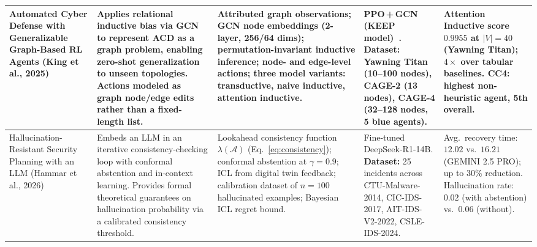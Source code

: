 \documentclass[letterpaper, 10 pt, conference]{ieeeconf}
\begin{document}
\begin{table}[!t]
{\begin{tabular}{|p{3.0cm}|p{4.2cm}|p{3.8cm}|p{3.8cm}|p{3.6cm}|}
    Automated Cyber Defense with Generalizable
    Graph-Based RL Agents
    \newline (King et al., 2025)~\cite{arXiv:2509.16151}
    &
    Applies relational inductive bias via GCN to represent
    ACD as a graph problem, enabling zero-shot
    generalization to unseen topologies. Actions modeled
    as graph node/edge edits rather than a fixed-length list.
    &
    Attributed graph observations; GCN node embeddings
    (2-layer, 256/64 dims); permutation-invariant inductive
    inference; node- and edge-level actions; three model
    variants: transductive, naive inductive, attention
    inductive.
    &
    PPO\,+\,GCN (KEEP model)~\cite{KEEP:2025}.
    \newline
    \textbf{Dataset:} Yawning Titan (10--100 nodes),
    CAGE-2 (13 nodes), CAGE-4 (32--128 nodes, 5 blue
    agents).
    &
    Attention Inductive score~$0.9955$ at $|V|=40$
    (Yawning Titan); $4\times$ over tabular baselines.
    CC4: highest non-heuristic agent, 5th overall. \\
    \hline
 
    Hallucination-Resistant Security Planning with an LLM
    \newline (Hammar et al., 2026)~\cite{arXiv:2602.05279}
    &
    Embeds an LLM in an iterative consistency-checking
    loop with conformal abstention and in-context learning.
    Provides formal theoretical guarantees on hallucination
    probability via a calibrated consistency threshold.
    &
    Lookahead consistency function $\lambda(\mathcal{A})$
    (Eq.~\ref{eq:consistency}); conformal abstention at
    $\gamma=0.9$; ICL from digital twin feedback;
    calibration dataset of $n=100$ hallucinated examples;
    Bayesian ICL regret bound.
    &
    Fine-tuned DeepSeek-R1-14B.
    \newline
    \textbf{Dataset:} 25 incidents across CTU-Malware-2014,
    CIC-IDS-2017, AIT-IDS-V2-2022, CSLE-IDS-2024.
    &
    Avg.\ recovery time: $12.02$ vs.\ $16.21$
    (GEMINI 2.5 PRO); up to 30\% reduction.
    Hallucination rate: $0.02$ (with abstention)
    vs.\ $0.06$ (without). \\
    \hline
 

\end{tabular}}
\end{table}
\end{document}

